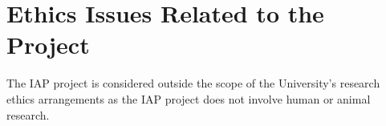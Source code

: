 \section{Ethics Issues Related to the Project}

The IAP project is considered outside the scope of the University's research ethics arrangements as the IAP project does not involve human or animal research. 